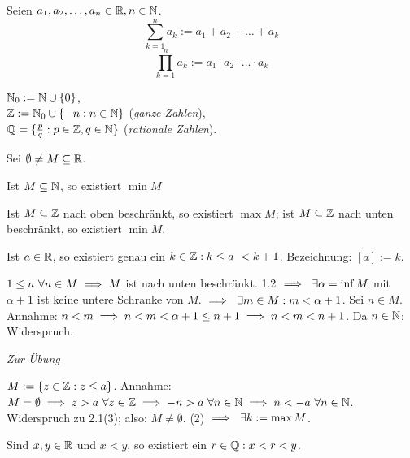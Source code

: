\documentclass[a4paper,twoside,DIV15,BCOR12mm]{scrbook}
\begin{document}
\begin{definition}
\begin{liste}
\item Seien $a_1,a_2,\ldots,a_n \in \mathbb{R}, n \in \mathbb{N}$.
$$ \sum_{k=1}^n a_k  := a_1 +     a_2 +     \ldots +     a_k $$
$$ \prod_{k=1}^n a_k := a_1 \cdot a_2 \cdot \ldots \cdot a_k $$

\item $\mathbb{N}_0 := \mathbb{N} \cup \{0\}$,\\
 $\mathbb{Z} := \mathbb{N}_0 \cup \{-n: n\in \mathbb{N}\}$ (\textit{ganze Zahlen}),\\
 $\mathbb{Q} = \{ \frac{p}{q}: p \in \mathbb{Z}, q \in \mathbb{N} \}$ (\textit{rationale Zahlen}).
\end{liste}
\end{definition}

\begin{satz}
Sei $\emptyset \ne M \subseteq \mathbb{R}$.

\begin{liste}
\item Ist $M \subseteq \mathbb{N}$, so existiert $\min{M}$
\item Ist $M \subseteq \mathbb{Z}$ nach oben beschränkt, so existiert $\max{M}$; ist $M \subseteq \mathbb{Z}$ nach unten beschränkt, so existiert $\min{M}$.
\item Ist $a \in \mathbb{R}$, so existiert genau ein $k \in \mathbb{Z}: k \le a \ < k+1$. Bezeichnung: $[a] := k$.
\end{liste}
\end{satz}

\begin{beweise}
\item $ 1 \le n \ \forall n \in M \implies M $ ist nach unten beschränkt. 1.2 $\folgt \ \exists \alpha = \inf{M}$ mit $\alpha + 1 $ ist keine untere Schranke von $M$. $\implies \ \exists m \in M: m < \alpha + 1$. Sei $n \in M$. Annahme: $n < m \implies n <  m < \alpha +1 \le n +1 \implies n < m < n+1$. Da $n \in \mathbb{N}$: Widerspruch.
\item \textit{Zur Übung}
\item $M := \{ z \in \mathbb{Z}: z \le a \}$. Annahme: $M = \emptyset\folgt z > a \ \forall z \in \MdZ \folgt -n > a \ \forall n \in \MdN \folgt n < -a \ \forall n \in \MdN$. Widerspruch zu 2.1(3); also: $M \ne \emptyset$. (2) $\implies \ \exists k := \max{M}$.
\end{beweise}

\begin{satz}
Sind $x,y \in \mathbb{R}$ und $x<y$, so existiert ein $r \in \mathbb{Q}: x < r < y$.
\end{satz}
\end{document}
